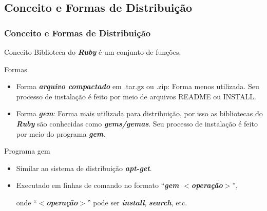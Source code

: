 \subsection{Conceito e Formas de Distribuição}
\begin{frame}
 \frametitle{Conceito e Formas de Distribuição}

  \begin{block}{Conceito}  
   Biblioteca do \emph{\textbf{Ruby}} é um conjunto de funções.
  \end{block}

 
  \begin{block}{Formas}

   \begin{itemize}

    \item Forma \emph{\textbf{arquivo compactado}} em .tar.gz ou .zip: Forma menos utilizada. Seu processo
    de instalação é feito por meio de arquivos README ou INSTALL.   
   
    \item Forma \emph{\textbf{gem}}: Forma mais utilizada para distribuição, por isso as bibliotecas do
    \emph{\textbf{Ruby}} são conhecidas como \emph{\textbf{gems/gemas}}. Seu processo de instalação
    é feito por meio do programa \emph{\textbf{gem}}.

   \end{itemize}

  \end{block}

  \begin{block}{Programa gem}

   \begin{itemize}

    \item Similar ao sistema de distribuição \emph{\textbf{apt-get}}.

    \item Executado em linhas de comando no formato ``\emph{\textbf{gem $<$operação$>$}}'',

    onde ``\emph{\textbf{$<$operação$>$}}'' pode ser \emph{\textbf{install}}, \emph{\textbf{search}}, etc.

   \end{itemize}

  \end{block}

\end{frame}


